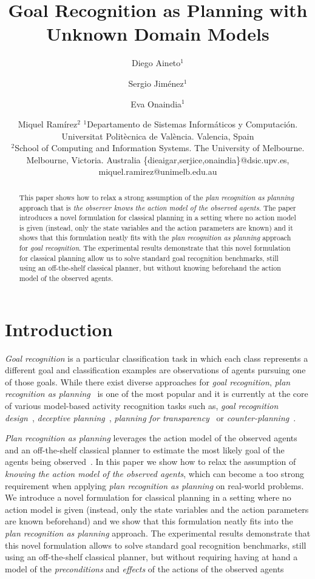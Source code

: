 \documentclass{article}
\title{Goal Recognition as Planning with Unknown Domain Models}
\author{
Diego Aineto$^1$\and
Sergio Jim\'enez$^1$\and
Eva Onaindia$^1$\And
\and
Miquel Ram\'irez$^2$
\affiliations
$^1${\small Departamento de Sistemas Inform\'aticos y Computaci\'on. Universitat Polit\`ecnica de Val\`encia. Valencia, Spain}\\
$^2${\small School of Computing and Information Systems. The University of Melbourne. Melbourne, Victoria. Australia}
\emails
{\scriptsize \{dieaigar,serjice,onaindia\}@dsic.upv.es, miquel.ramirez@unimelb.edu.au}}
\begin{document}
\maketitle

\begin{abstract}
This paper shows how to relax a strong assumption of the {\em plan recognition as planning} approach that is {\em the observer knows the action model of the observed agents}. The paper introduces a novel formulation for classical planning in a setting where no action model is given (instead, only the state variables and the action parameters are known) and it shows that this formulation neatly fits with the {\em plan recognition as planning} approach for {\em goal recognition}. The experimental results demonstrate that this novel formulation for classical planning allow us to solve standard goal recognition benchmarks, still using an off-the-shelf classical planner, but without knowing beforehand the action model of the observed agents.  
\end{abstract}

\section{Introduction}
\label{sec:introduction}
{\em Goal recognition} is a particular classification task in which each class represents a different goal and classification examples are observations of agents pursuing one of those goals. While there exist diverse approaches for {\em goal recognition}, {\em plan recognition as planning}~\cite{ramirez2009plan,ramirez2010probabilistic} is one of the most popular and it is currently at the core of various model-based activity recognition tasks such as, {\em goal recognition design}~\cite{KerenGK14}, {\em deceptive planning}~\cite{masters2017deceptive}, {\em planning for transparency}~\cite{macnally2018action} or {\em counter-planning}~\cite{PozancoEFB18}.

{\em Plan recognition as planning} leverages the action model of the observed agents and an off-the-shelf classical planner to estimate the most likely goal of the agents being observed~\cite{ramirez2012plan}. In this paper we show how to relax the assumption of {\em knowing the action model of the observed agents}, which can become a too strong requirement when applying {\em plan recognition as planning} on real-world problems.  We introduce a novel formulation for classical planning in a setting where no action model is given (instead, only the state variables and the action parameters are known beforehand) and we show that this formulation neatly fits into the {\em plan recognition as planning} approach. The experimental results demonstrate that this novel formulation allows to solve standard goal recognition benchmarks, still using an off-the-shelf classical planner, but without requiring having at hand a model of the {\em preconditions} and {\em effects} of the actions of the observed agents 
\end{document}
